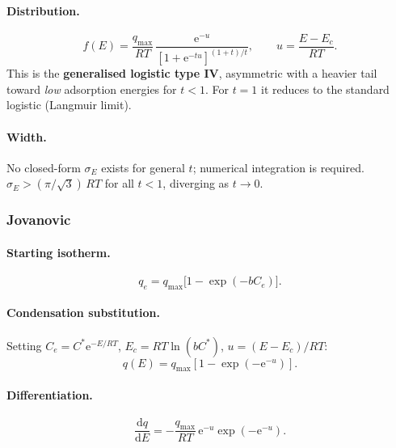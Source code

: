 \documentclass[journal=jacsat,manuscript=article]{achemso}
\begin{document}
\paragraph{Distribution.}
\begin{equation}
	f(E) = \frac{q_{\max}}{RT}\,
	\frac{\mathrm{e}^{-u}}
	{[1 + \mathrm{e}^{-tu}]^{(1+t)/t}},
	\qquad u = \frac{E - E_c}{RT}.
	\label{eq:si_fE_toth}
\end{equation}
This is the \textbf{generalised logistic type IV}, asymmetric with a heavier tail
toward \emph{low} adsorption energies for $t < 1$.
For $t = 1$ it reduces to the standard logistic (Langmuir limit).

\paragraph{Width.}
No closed-form $\sigma_E$ exists for general $t$; numerical integration is required.
$\sigma_E > (\pi/\sqrt{3})\,RT$ for all $t < 1$, diverging as $t \to 0$.

\subsubsection{Jovanovic}

\paragraph{Starting isotherm.}
\begin{equation}
	q_e = q_{\max}\bigl[1 - \exp(-b C_e)\bigr].
\end{equation}

\paragraph{Condensation substitution.}
Setting $C_e = C^{\ast}\mathrm{e}^{-E/RT}$, $E_c = RT\ln(bC^{\ast})$,
$u = (E-E_c)/RT$:
\begin{equation}
	q(E) = q_{\max}\!\left[1 - \exp\!\left(-\mathrm{e}^{-u}\right)\right].
\end{equation}

\paragraph{Differentiation.}
\begin{equation}
	\frac{\mathrm{d}q}{\mathrm{d}E}
	= -\frac{q_{\max}}{RT}\,\mathrm{e}^{-u}\exp\!\left(-\mathrm{e}^{-u}\right).
\end{equation}
\end{document}
